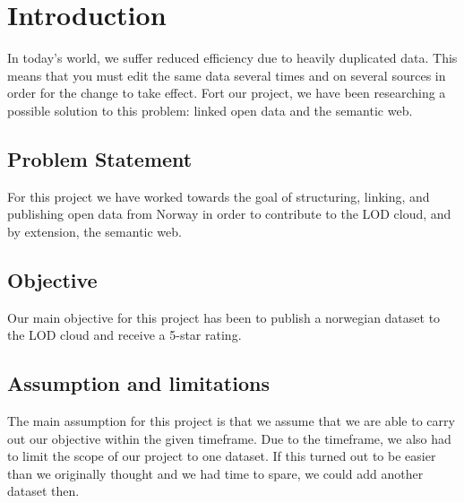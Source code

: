 \chapter{Introduction}
In today’s world, we suffer reduced efficiency due to heavily duplicated data. This means that you must edit the same data several times and on several sources in order for the change to take effect. Fort our project, we have been researching a possible solution to this problem: linked open data and the semantic web.

\section{Problem Statement}
For this project we have worked towards the goal of structuring, linking, and publishing open data from Norway in order to contribute to the LOD cloud, and by extension, the semantic web.

\section{Objective}
Our main objective for this project has been to publish a norwegian dataset to the LOD cloud and receive a 5-star rating.

\section{Assumption and limitations}
The main assumption for this project is that we assume that we are able to carry out our objective within the given timeframe. Due to the timeframe, we also had to limit the scope of our project to one dataset. If this turned out to be easier than we originally thought and we had time to spare, we could add another dataset then.
